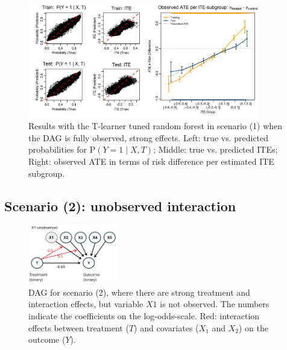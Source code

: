 \begin{figure}[htbp]
\centering
\includegraphics[width=0.9\textwidth]{img/results_ITE_simulation/fully_observed_tuned_rf_tlearner.png}
\caption{Results with the T-learner tuned random forest in scenario (1) when the DAG is fully observed, strong effects. Left: true vs. predicted probabilities for $\text{P}(Y=1 \mid X, T)$; Middle: true vs. predicted ITEs; Right: observed ATE in terms of risk difference per estimated ITE subgroup.}
\label{fig:fully_tuned_rf_tlearner}
\end{figure}


\clearpage



\subsection{Scenario (2): unobserved interaction}

\begin{figure}[htbp]
\centering
\includegraphics[width=0.35\textwidth]{img/results_ITE_simulation/simulation_unobserved.png}
\caption{DAG for scenario (2), where there are strong treatment and interaction effects, but variable $X1$ is not observed. The numbers indicate the coefficients on the log-odds-scale. Red: interaction effects between treatment ($T$) and covariates ($X_1$ and $X_2$) on the outcome ($Y$).}
\label{fig:unobserved_interaction_dag}
\end{figure}



